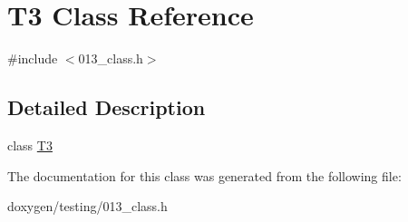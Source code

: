\hypertarget{class_t3}{}\section{T3 Class Reference}
\label{class_t3}


{\ttfamily \#include $<$013\+\_\+class.\+h$>$}



\subsection{Detailed Description}
class \mbox{\hyperlink{class_t3}{T3}} 

The documentation for this class was generated from the following file\+:\begin{DoxyCompactItemize}
\item 
doxygen/testing/013\+\_\+class.\+h\end{DoxyCompactItemize}
